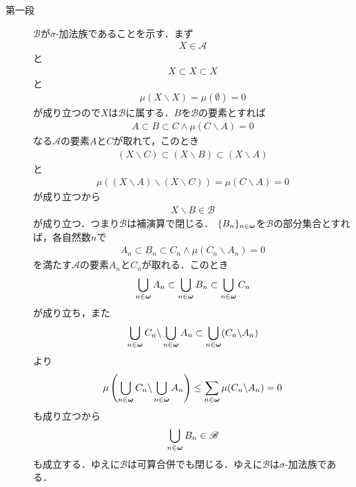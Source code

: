 		\begin{sketch}\mbox{}
			\begin{description}
				\item[第一段] $\mathscr{B}$が$\sigma$-加法族であることを示す．まず
					\begin{align}
						X \in \mathscr{A}
					\end{align}
					と
					\begin{align}
						X \subset X \subset X
					\end{align}
					と
					\begin{align}
						\mu(X \backslash X) = \mu(\emptyset) = 0
					\end{align}
					が成り立つので$X$は$\mathscr{B}$に属する．$B$を$\mathscr{B}$の要素とすれば
					\begin{align}
						A \subset B \subset C \wedge \mu(C \backslash A)=0
					\end{align}
					なる$\mathscr{A}$の要素$A$と$C$が取れて，このとき
					\begin{align}
						(X \backslash C) \subset (X \backslash B) \subset (X \backslash A) 
					\end{align}
					と
					\begin{align}
						\mu\left((X \backslash A)\backslash (X \backslash C)\right) 
						= \mu(C \backslash A) 
						= 0
					\end{align}
					が成り立つから
					\begin{align}
						X \backslash B \in \mathscr{B}
					\end{align}
					が成り立つ．つまり$\mathscr{B}$は補演算で閉じる．
					$\{B_n\}_{n \in {\boldsymbol \omega}}$を$\mathscr{B}$の部分集合とすれば，各自然数$n$で
					\begin{align}
						A_n \subset B_n \subset C_n \wedge \mu(C_n \backslash A_n)=0
					\end{align}
					を満たす$\mathscr{A}$の要素$A_n$と$C_n$が取れる．このとき
					\begin{align}
						\bigcup_{n \in {\boldsymbol \omega}} A_n 
						\subset \bigcup_{n \in {\boldsymbol \omega}} B_n
						\subset \bigcup_{n \in {\boldsymbol \omega}} C_n
					\end{align}
					が成り立ち，また
					\begin{align}
						\bigcup_{n \in {\boldsymbol \omega}} C_n \backslash \bigcup_{n \in {\boldsymbol \omega}} A_n
						\subset \bigcup_{n \in {\boldsymbol \omega}} (C_n \backslash A_n)
					\end{align}
					より
					\begin{align}
						\mu\left( \bigcup_{n \in {\boldsymbol \omega}} C_n \backslash \bigcup_{n \in {\boldsymbol \omega}} A_n \right)
						\leq \sum_{n \in {\boldsymbol \omega}} \mu(C_n \backslash A_n)
						= 0
					\end{align}
					も成り立つから
					\begin{align}
						\bigcup_{n \in {\boldsymbol \omega}} B_n \in \mathscr{B}
					\end{align}
					も成立する．ゆえに$\mathscr{B}$は可算合併でも閉じる．ゆえに$\mathscr{B}$は$\sigma$-加法族である．
					

\end{description}
\end{sketch}
